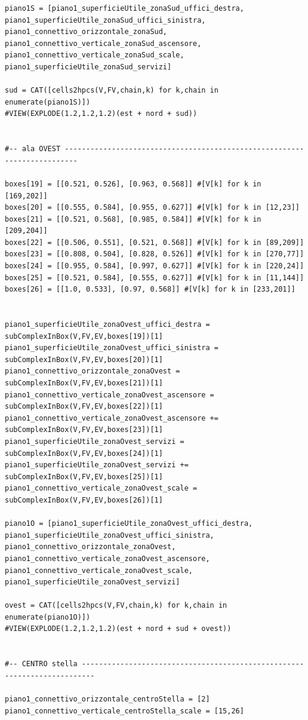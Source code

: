 \documentclass[11pt, oneside]{article}   	%
\begin{document}
\begin{verbatim}
piano1S = [piano1_superficieUtile_zonaSud_uffici_destra, piano1_superficieUtile_zonaSud_uffici_sinistra, piano1_connettivo_orizzontale_zonaSud, piano1_connettivo_verticale_zonaSud_ascensore, piano1_connettivo_verticale_zonaSud_scale, piano1_superficieUtile_zonaSud_servizi]
    
sud = CAT([cells2hpcs(V,FV,chain,k) for k,chain in enumerate(piano1S)])
#VIEW(EXPLODE(1.2,1.2,1.2)(est + nord + sud))


#-- ala OVEST -------------------------------------------------------------------------

boxes[19] = [[0.521, 0.526], [0.963, 0.568]] #[V[k] for k in [169,202]]
boxes[20] = [[0.555, 0.584], [0.955, 0.627]] #[V[k] for k in [12,23]]
boxes[21] = [[0.521, 0.568], [0.985, 0.584]] #[V[k] for k in [209,204]]
boxes[22] = [[0.506, 0.551], [0.521, 0.568]] #[V[k] for k in [89,209]]
boxes[23] = [[0.808, 0.504], [0.828, 0.526]] #[V[k] for k in [270,77]]
boxes[24] = [[0.955, 0.584], [0.997, 0.627]] #[V[k] for k in [220,24]]
boxes[25] = [[0.521, 0.584], [0.555, 0.627]] #[V[k] for k in [11,144]]
boxes[26] = [[1.0, 0.533], [0.97, 0.568]] #[V[k] for k in [233,201]]


piano1_superficieUtile_zonaOvest_uffici_destra = subComplexInBox(V,FV,EV,boxes[19])[1]
piano1_superficieUtile_zonaOvest_uffici_sinistra = subComplexInBox(V,FV,EV,boxes[20])[1]
piano1_connettivo_orizzontale_zonaOvest = subComplexInBox(V,FV,EV,boxes[21])[1]
piano1_connettivo_verticale_zonaOvest_ascensore = subComplexInBox(V,FV,EV,boxes[22])[1]
piano1_connettivo_verticale_zonaOvest_ascensore += subComplexInBox(V,FV,EV,boxes[23])[1]
piano1_superficieUtile_zonaOvest_servizi = subComplexInBox(V,FV,EV,boxes[24])[1]
piano1_superficieUtile_zonaOvest_servizi += subComplexInBox(V,FV,EV,boxes[25])[1]
piano1_connettivo_verticale_zonaOvest_scale = subComplexInBox(V,FV,EV,boxes[26])[1]

piano1O = [piano1_superficieUtile_zonaOvest_uffici_destra, piano1_superficieUtile_zonaOvest_uffici_sinistra, piano1_connettivo_orizzontale_zonaOvest, piano1_connettivo_verticale_zonaOvest_ascensore, piano1_connettivo_verticale_zonaOvest_scale, piano1_superficieUtile_zonaOvest_servizi]
    
ovest = CAT([cells2hpcs(V,FV,chain,k) for k,chain in enumerate(piano1O)])
#VIEW(EXPLODE(1.2,1.2,1.2)(est + nord + sud + ovest))


#-- CENTRO stella -------------------------------------------------------------------------

piano1_connettivo_orizzontale_centroStella = [2]
piano1_connettivo_verticale_centroStella_scale = [15,26]


\end{verbatim}
\end{document}
